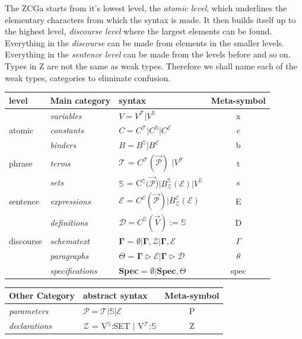 The ZCGa starts from it's lowest level, the \emph{atomic level}, which underlines the elementary characters from which the syntax is made. It then builds itself up to the highest level, \emph{discourse level} where the largest elements can be found. Everything in the \emph{discourse} can be made from
elements in the smaller levels. Everything in the \emph{sentence level} can be made from the levels before and so on.
Types in Z are not the same as weak types. Therefore we shall name each of the weak types, categories to eliminate confusion.

\begin{table}[H]
\begin{tabular}{|l || l | l | c|}
\hline
level & Main category & syntax & Meta-symbol\\
\hline
& \textit{variables} & $V = V ^ {\mathcal{T}} \vert V ^ {\mathbb{S}}$ & x  \\
atomic & \textit{constants} & $C = C ^ {\mathcal{T}} \vert C ^ {\mathbb{S}} \vert C ^ \mathcal{E}$ & c  \\
& \textit{binders} & $B = B ^ {\mathbb{S}} \vert B ^ \mathcal{E}$ & b \\
\hline
phrase & \textit{terms} & $\mathcal{T}$ = $C^{\mathcal{T}}(\overrightarrow{\mathcal{P}})$  $\vert V ^ {\mathcal{T}}$ & t \\
 & \textit{sets} & $\mathbb{S}$ = C$^{\mathbb{S}}(\overrightarrow{\mathcal{P}}$)$\vert B^{\mathbb{S}}_{\mathcal{Z}}(\mathcal{E}) \vert V^\mathbb{S}$ & s \\
\hline
sentence & \textit{expressions} & $\mathcal{E}$ = $C^{\mathcal{E}}(\overrightarrow{\mathcal{P}}) \vert B^{\mathcal{E}}_{\mathcal{Z}}(\mathcal{E})$ & E  \\
& \textit{definitions} & $\mathcal{D} = C^{\mathbb{S}}(\overrightarrow{V}):= \mathbb{S}$ & D \\
\hline
discourse & \textit{schematext} & $\mathbf{\Gamma}$ = $\emptyset \vert \mathbf{\Gamma}, \mathcal{Z} \vert \mathbf{\Gamma}, \mathcal{E}$ & $\Gamma$\\
& \textit{paragraphs} & $\Theta$ = $\mathbf{\Gamma} \triangleright \mathcal{E} \vert \mathbf{\Gamma} \triangleright \mathcal{D}$ & $\theta$\\
& \textit{specifications} & \textbf{Spec} = $\emptyset \vert \mathbf{Spec}, \Theta$  & spec \\
\hline
\end{tabular}

\begin{tabular}{|l|l|c|}
\hline
Other Category & abstract syntax & Meta-symbol\\
\hline
\textit{parameters} & $\mathcal{P} = \mathcal{T} \vert \mathbb{S} \vert \mathcal{E}$ & P\\
\textit{declarations} & $\mathcal{Z}$ = V$^{\mathbb{S}}$:SET $\vert$ V$^{\mathcal{T}}$:$\mathbb{S}$ & Z\\
\hline
\end{tabular}


\end{table}
